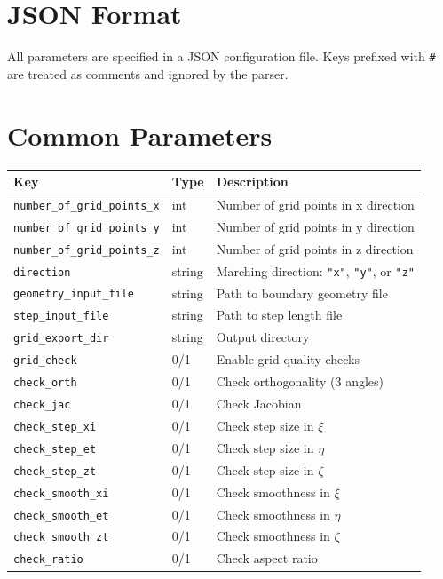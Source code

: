 \documentclass[11pt,a4paper]{report}
\begin{document}
\section{JSON Format}

All parameters are specified in a JSON configuration file. Keys prefixed with \texttt{\#} are treated as comments and ignored by the parser.

\section{Common Parameters}

\begin{longtable}{p{5.5cm} p{2cm} p{7cm}}
\toprule
\textbf{Key} & \textbf{Type} & \textbf{Description} \\
\midrule
\texttt{number\_of\_grid\_points\_x} & int & Number of grid points in x direction \\
\texttt{number\_of\_grid\_points\_y} & int & Number of grid points in y direction \\
\texttt{number\_of\_grid\_points\_z} & int & Number of grid points in z direction \\
\texttt{direction} & string & Marching direction: \texttt{"x"}, \texttt{"y"}, or \texttt{"z"} \\
\texttt{geometry\_input\_file} & string & Path to boundary geometry file \\
\texttt{step\_input\_file} & string & Path to step length file \\
\texttt{grid\_export\_dir} & string & Output directory \\
\texttt{grid\_check} & 0/1 & Enable grid quality checks \\
\texttt{check\_orth} & 0/1 & Check orthogonality (3 angles) \\
\texttt{check\_jac} & 0/1 & Check Jacobian \\
\texttt{check\_step\_xi} & 0/1 & Check step size in $\xi$ \\
\texttt{check\_step\_et} & 0/1 & Check step size in $\eta$ \\
\texttt{check\_step\_zt} & 0/1 & Check step size in $\zeta$ \\
\texttt{check\_smooth\_xi} & 0/1 & Check smoothness in $\xi$ \\
\texttt{check\_smooth\_et} & 0/1 & Check smoothness in $\eta$ \\
\texttt{check\_smooth\_zt} & 0/1 & Check smoothness in $\zeta$ \\
\texttt{check\_ratio} & 0/1 & Check aspect ratio \\
\bottomrule
\end{longtable}
\end{document}
